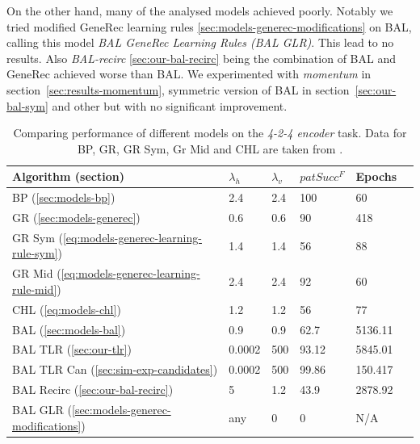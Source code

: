 On the other hand, many of the analysed models achieved poorly. Notably we tried modified GeneRec learning rules \ref{sec:models-generec-modifications} on BAL, calling this model \emph{BAL GeneRec Learning Rules (BAL GLR)}. This lead to no results. Also \emph{BAL-recirc} \ref{sec:our-bal-recirc} being the combination of BAL and GeneRec achieved worse than BAL. We experimented with \emph{momentum} in section~\ref{sec:results-momentum}, symmetric version of BAL in section~\ref{sec:our-bal-sym} and other but with no significant improvement. 

\begin{table}[H] 
  \centering
    \begin{tabular}{|l|l|l|l|l|l|}
    \hline
    Algorithm (section)&$\lambda_h$&$\lambda_v$&$patSucc^F$ &Epochs\\ %
    \hline
    BP (\ref{sec:models-bp}) &2.4 &2.4 &100&60\\ %
    \hline
    GR (\ref{sec:models-generec}) &0.6 &0.6 &90&418\\ %
    \hline
    GR Sym (\ref{eq:models-generec-learning-rule-sym}) &1.4 &1.4 &56&88\\ %
    \hline
    GR Mid (\ref{eq:models-generec-learning-rule-mid}) &2.4 &2.4 &92&60\\ %
    \hline
    CHL (\ref{eq:models-chl}) &1.2 &1.2 &56&77\\ %
    \hline
    BAL (\ref{sec:models-bal})&0.9 &0.9 &62.7& 5136.11\\ %
    \hline
    BAL TLR (\ref{sec:our-tlr})&0.0002  & 500&93.12&5845.01\\ %
    \hline
    BAL TLR Can (\ref{sec:sim-exp-candidates})&0.0002&500&99.86&150.417\\ %
    \hline
    BAL Recirc (\ref{sec:our-bal-recirc})&5&1.2&43.9&2878.92\\ %
    \hline
    BAL GLR (\ref{sec:models-generec-modifications})& any & 0 & 0 & N/A \\ 
    \hline 
    \end{tabular}
  \caption{Comparing performance of different models on the \emph{4-2-4 encoder} task. Data for BP, GR, GR Sym, Gr Mid and CHL are taken from \citet{o1996bio}.} 
  \label{tab:results-cmp-auto4}
\end{table}


